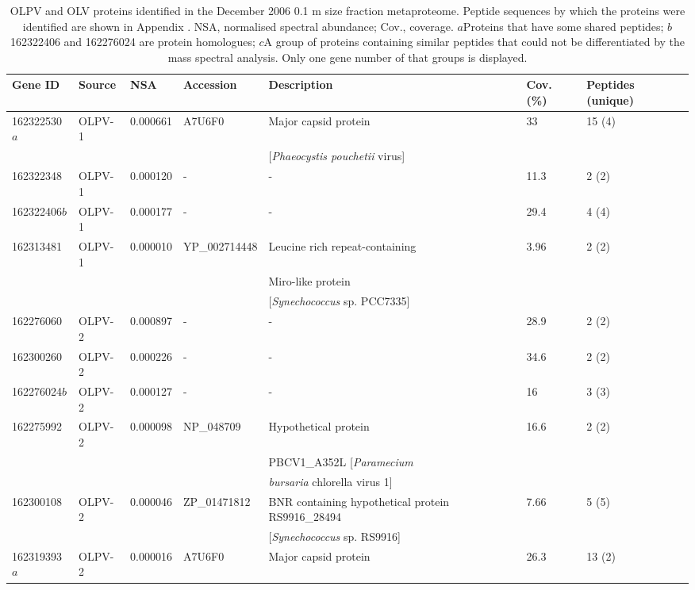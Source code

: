\begingroup
\begin{table}
\footnotesize
\caption[OLPV and OLV proteins identified in the metaproteome]{OLPV and OLV proteins identified in the December 2006 0.1 \textmu{}m size fraction metaproteome. Peptide sequences by which the proteins were identified are shown in Appendix . NSA, normalised spectral abundance; Cov., coverage. $a$Proteins that have some shared peptides; $b$162322406 and 162276024 are protein homologues; $c$A group of proteins containing similar peptides that could not be differentiated by the mass spectral analysis. Only one gene number of that groups is displayed.}
\label{tab:pmics}
\smallskip
\begin{tabularx}{\textwidth}{p{1.3cm}p{1.2cm}p{1cm}p{1.8cm}p{4.7cm}p{0.4cm}p{1.4cm}}
\toprule
\textbf{Gene ID} & \textbf{Source} & \textbf{NSA} & \textbf{Accession} & \textbf{Description} & \textbf{Cov. (\%)} & \textbf{Peptides (unique)} \\
\midrule
162322530$a$ & OLPV-1 & 0.000661 & A7U6F0 & Major capsid protein & 33 & 15 (4) \\
 &  &  &  & [\emph{Phaeocystis pouchetii} virus] &  & \\
162322348 & OLPV-1 & 0.000120 & - & - & 11.3 & 2 (2) \\
162322406$b$ & OLPV-1 & 0.000177 & - & - & 29.4 & 4 (4) \\
162313481 & OLPV-1 & 0.000010 & YP\_002714448 & Leucine rich repeat-containing & 3.96 & 2 (2) \\
 &  &  &  & Miro-like protein & & \\
 &  &  &  & [\emph{Synechococcus} sp. PCC7335] &  & \\
162276060 & OLPV-2 & 0.000897 & - & - & 28.9 & 2 (2) \\
162300260 & OLPV-2 & 0.000226 & - & - & 34.6 & 2 (2) \\
162276024$b$ & OLPV-2 & 0.000127 & - & - & 16 & 3 (3) \\
162275992 & OLPV-2 & 0.000098 & NP\_048709 & Hypothetical protein & 16.6 & 2 (2) \\
 &  &  &  & PBCV1\_A352L [\emph{Paramecium} & &  \\
 &  &  &  & \emph{bursaria} chlorella virus 1] & &  \\
162300108 & OLPV-2 & 0.000046 & ZP\_01471812 & BNR containing hypothetical protein RS9916\_28494 & 7.66 & 5 (5) \\
 &  &  &  & [\emph{Synechococcus} sp. RS9916] &  &  \\
162319393$a$ & OLPV-2 & 0.000016 & A7U6F0 & Major capsid protein & 26.3 & 13 (2) \\

\end{tabularx}
\end{table}
